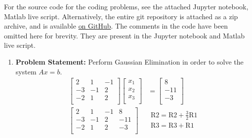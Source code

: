 \documentclass[12pt,twoside]{amsart}
\begin{document}
\thispagestyle{fancy}
\pagestyle{fancy}
\fancyhf{}

For the source code for the coding problems, see the attached Jupyter notebook, Matlab live script. Alternatively, the entire git repository  is attached as a zip archive, and is available \href{https://github.com/blackHat-Magic/math-131-HW7}{on GitHub}. The comments in the code have been omitted here for brevity. They are present in the Jupyter notebook and Matlab live script.

\begin{enumerate}
    \item \textbf{Problem Statement:} Perform Gaussian Elimination in order to solve the system $Ax = b$.
    \begin{align*}
        \left[\begin{array}{ccc}
            2 & 1 & -1 \\
            -3 & -1 & 2 \\
            -2 & 1 & 2 \\
        \end{array}\right]\left[\begin{array}{c}
            x_1 \\
            x_2 \\
            x_3 \\
        \end{array}\right] & = \left[\begin{array}{c}
            8 \\
            -11 \\
            -3 \\
        \end{array}\right] \\
        \left[\begin{array}{ccc|c}
            2 & 1 & -1 & 8 \\
            -3 & -1 & 2 & -11 \\
            -2 & 1 & 2 & -3 \\
        \end{array}\right] & \begin{array}{c}
            \text{R2} = \text{R2} + \frac{3}{2}\text{R1} \\
            \text{R3} = \text{R3} + \text{R1} \\
        \end{array} \\

\end{align*}
\end{enumerate}
\end{document}
